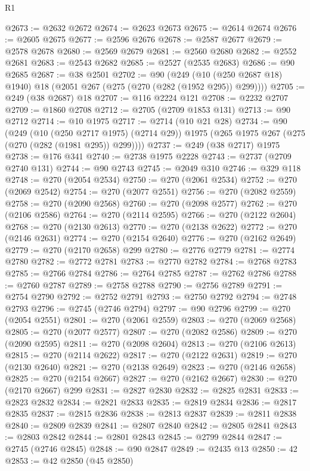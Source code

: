 \begin{lexlean}{R1}
\begin{coremodule}
@2673 := @2632 @2672
@2674 := @2623 @2673
@2675 := @2614 @2674
@2676 := @2605 @2675
@2677 := @2596 @2676
@2678 := @2587 @2677
@2679 := @2578 @2678
@2680 := @2569 @2679
@2681 := @2560 @2680
@2682 := @2552 @2681
@2683 := @2543 @2682
@2685 := @2527 (@2535 @2683)
@2686 := @90 @2685
@2687 := @38 @2501
@2702 := @90
    (@249 (@10 (@250 @2687 @18) @1940) @18 (@2051 @267 (@275 (@270 (@282 (@1952 @295)) @299))))
@2705 := @249 (@38 @2687) @18
@2707 := @116 @2224 @121
@2708 := @2232 @2707
@2709 := @1860 @2708
@2712 := @2705 (@2709 @1853 @131)
@2713 := @90 @2712
@2714 := @10 @1975
@2717 := @2714 (@10 @21 @28)
@2734 := @90
    (@249
      (@10 (@250 @2717 @1975) (@2714 @29))
      @1975
      (@265 @1975 @267 (@275 (@270 (@282 (@1981 @295)) @299))))
@2737 := @249 (@38 @2717) @1975
@2738 := @176 @341
@2740 := @2738 @1975 @2228
@2743 := @2737 (@2709 @2740 @131)
@2744 := @90 @2743
@2745 := @2049 @310
@2746 := @329 @118
@2748 := @270 (@2054 @2534)
@2750 := @270 (@2061 @2534)
@2752 := @270 (@2069 @2542)
@2754 := @270 (@2077 @2551)
@2756 := @270 (@2082 @2559)
@2758 := @270 (@2090 @2568)
@2760 := @270 (@2098 @2577)
@2762 := @270 (@2106 @2586)
@2764 := @270 (@2114 @2595)
@2766 := @270 (@2122 @2604)
@2768 := @270 (@2130 @2613)
@2770 := @270 (@2138 @2622)
@2772 := @270 (@2146 @2631)
@2774 := @270 (@2154 @2640)
@2776 := @270 (@2162 @2649)
@2779 := @270 (@2170 @2658) @299
@2780 := @2776 @2779
@2781 := @2774 @2780
@2782 := @2772 @2781
@2783 := @2770 @2782
@2784 := @2768 @2783
@2785 := @2766 @2784
@2786 := @2764 @2785
@2787 := @2762 @2786
@2788 := @2760 @2787
@2789 := @2758 @2788
@2790 := @2756 @2789
@2791 := @2754 @2790
@2792 := @2752 @2791
@2793 := @2750 @2792
@2794 := @2748 @2793
@2796 := @2745 (@2746 @2794)
@2797 := @90 @2796
@2799 := @270 (@2054 @2551)
@2801 := @270 (@2061 @2559)
@2803 := @270 (@2069 @2568)
@2805 := @270 (@2077 @2577)
@2807 := @270 (@2082 @2586)
@2809 := @270 (@2090 @2595)
@2811 := @270 (@2098 @2604)
@2813 := @270 (@2106 @2613)
@2815 := @270 (@2114 @2622)
@2817 := @270 (@2122 @2631)
@2819 := @270 (@2130 @2640)
@2821 := @270 (@2138 @2649)
@2823 := @270 (@2146 @2658)
@2825 := @270 (@2154 @2667)
@2827 := @270 (@2162 @2667)
@2830 := @270 (@2170 @2667) @299
@2831 := @2827 @2830
@2832 := @2825 @2831
@2833 := @2823 @2832
@2834 := @2821 @2833
@2835 := @2819 @2834
@2836 := @2817 @2835
@2837 := @2815 @2836
@2838 := @2813 @2837
@2839 := @2811 @2838
@2840 := @2809 @2839
@2841 := @2807 @2840
@2842 := @2805 @2841
@2843 := @2803 @2842
@2844 := @2801 @2843
@2845 := @2799 @2844
@2847 := @2745 (@2746 @2845)
@2848 := @90 @2847
@2849 := @2435 @13
@2850 := 42
@2853 := @42 @2850 (@45 @2850)

\end{coremodule}
\end{lexlean}
